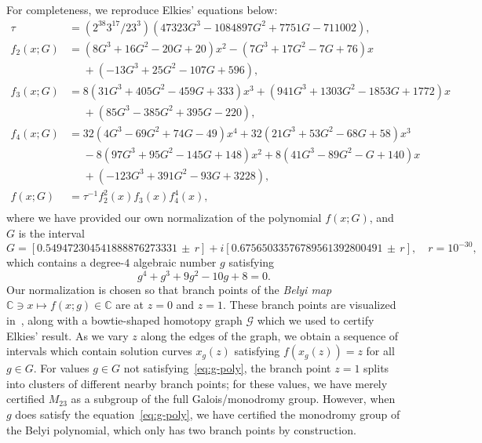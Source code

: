 \documentclass[11pt]{amsart}
\let\oldtextit\textit
\renewcommand\emph[1]{\oldtextit{\color{blue}#1}}
\theoremstyle{definition}
\theoremstyle{remark}
\newcommand{\CC}{{\mathbb C}}
\begin{document}
For completeness, we reproduce Elkies' equations below:
\begin{align}
\tau &= (2^{38}  3^{17}/23^3)  (47323 G^3 - 1084897 G^2 + 7751 G - 711002),\nonumber   \\
f_2 (x;G) &= (8 G^3 + 16   G^2 - 20 G + 20)   x^2 - (7 G^3 + 17 G^2 - 7 G + 76) x \nonumber \\
  &\phantom{=}     + (-13 G^3 + 25 G^2 - 107 G + 596),\nonumber \\
f_3 (x;G) &= 8 (31 G^3 + 405 G^2 - 459 G + 333)   x^3 + (941 G^3 + 1303   G^2 -1853 G + 1772) x  \nonumber \\
  &\phantom{=} + (85 G^3 - 385 G^2 + 395 G - 220),\nonumber \\
f_4 (x;G) &= 32   (4 G^3 - 69   G^2 + 74 G - 49)   x^4 + 32 (21 G^3 + 53 G^2 - 68 G + 58) x^3 \nonumber \\
  &\phantom{=} -8 (97 G^3+95 G^2-145 G+148) x^2 + 8   (41 G^3 - 89 G^2-G + 140) x \nonumber \\
  &\phantom{=} +(-123 G^3+391 G^2-93 G+3228),\nonumber \\
f(x;G) &= \tau^{-1} f_2^2(x) f_3 (x) f_4^4 (x) ,\nonumber  \\
\label{eq:mathieu-polynomials}
\end{align}
where we have provided our own normalization of the polynomial $f(x;G)$, and $G$ is the interval
\begin{equation}\label{eq:g-interval}
G = [0.549472304541888876273331 \, \pm \, r ] + i [0.67565033576789561392800491 \,  \pm \, r], 
\quad 
r = 10^{-30},
\end{equation}
which contains a degree-$4$ algebraic number $g$ satisfying
\begin{equation}\label{eq:g-poly}
g^4 + g^3 + 9g^2 - 10g + 8 = 0.
\end{equation}
Our normalization is chosen so that branch points of the \emph{Belyi map} $\CC \ni x \mapsto f(x;g) \in \CC$ are at $z=0$ and $z=1.$ These branch points are visualized in~, along with a bowtie-shaped homotopy graph $\mathcal{G}$ which we used to certify Elkies' result.
As we vary $z$ along the edges of the graph, we obtain a sequence of intervals which contain solution curves $x_g (z)$ satisfying $f(x_g(z))=z$ for all $g\in G.$
For values $g\in G$ not satisfying~\eqref{eq:g-poly}, the branch point $z=1$ splits into clusters of different nearby branch points; for these values, we have merely certified $M_{23}$ as a subgroup of the full Galois/monodromy group.
However, when $g$ does satisfy the equation~\eqref{eq:g-poly}, we have certified the monodromy group of the Belyi polynomial, which only has two branch points by construction.
\end{document}
